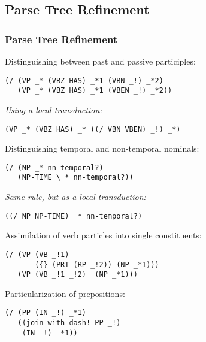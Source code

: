 \documentclass[8pt]{beamer}
\begin{document}
\subsection{Parse Tree Refinement}
\begin{frame}[fragile]
  \frametitle{Parse Tree Refinement}
Distinguishing between past and passive participles:
\vspace{-.1in}
\begin{verbatim}
(/ (VP _* (VBZ HAS) _*1 (VBN _!) _*2)
   (VP _* (VBZ HAS) _*1 (VBEN _!) _*2))
\end{verbatim}
\emph{Using a local transduction:}
\vspace{-0.1in}
\begin{verbatim}
(VP _* (VBZ HAS) _* ((/ VBN VBEN) _!) _*)
\end{verbatim}

Distinguishing temporal and non-temporal nominals:
\vspace{-0.1in}
\begin{verbatim}
(/ (NP _* nn-temporal?)
   (NP-TIME \_* nn-temporal?))
\end{verbatim}

\emph{Same rule, but as a local transduction:}
\vspace{-0.1in}
\begin{verbatim}
((/ NP NP-TIME) _* nn-temporal?)
\end{verbatim}


Assimilation of verb particles into single constituents:
\vspace{-0.1in}
\begin{verbatim}
(/ (VP (VB _!1)
       ({} (PRT (RP _!2)) (NP _*1)))
   (VP (VB _!1 _!2)  (NP _*1)))
\end{verbatim}


Particularization of prepositions:
\vspace{-0.1in}
\begin{verbatim}
(/ (PP (IN _!) _*1)
   ((join-with-dash! PP _!) 
    (IN _!) _*1))
\end{verbatim}
\end{frame}
\end{document}

